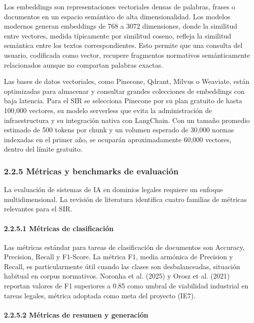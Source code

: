 \documentclass[12pt,a4paper,oneside]{report}
\begin{document}
Los embeddings son representaciones vectoriales densas de palabras,
frases o documentos en un espacio semántico de alta dimensionalidad. Los
modelos modernos generan embeddings de 768 a 3072 dimensiones, donde la
similitud entre vectores, medida típicamente por similitud coseno,
refleja la similitud semántica entre los textos correspondientes. Esto
permite que una consulta del usuario, codificada como vector, recupere
fragmentos normativos semánticamente relacionados aunque no compartan
palabras exactas.

Las bases de datos vectoriales, como Pinecone, Qdrant, Milvus o
Weaviate, están optimizadas para almacenar y consultar grandes
colecciones de embeddings con baja latencia. Para el SIR se selecciona
Pinecone por su plan gratuito de hasta 100,000 vectores, su modelo
serverless que evita la administración de infraestructura y su
integración nativa con LangChain. Con un tamaño promedio estimado de 500
tokens por chunk y un volumen esperado de 30,000 normas indexadas en el
primer año, se ocuparán aproximadamente 60,000 vectores, dentro del
límite gratuito.

\subsubsection{2.2.5 Métricas y benchmarks de
evaluación}\label{muxe9tricas-y-benchmarks-de-evaluaciuxf3n}

La evaluación de sistemas de IA en dominios legales requiere un enfoque
multidimensional. La revisión de literatura identifica cuatro familias
de métricas relevantes para el SIR.

\paragraph{2.2.5.1 Métricas de
clasificación}\label{muxe9tricas-de-clasificaciuxf3n}

Las métricas estándar para tareas de clasificación de documentos son
Accuracy, Precision, Recall y F1-Score. La métrica F1, media armónica de
Precision y Recall, es particularmente útil cuando las clases son
desbalanceadas, situación habitual en corpus normativos. Noronha et al.
(2025) y Orosz et al. (2021) reportan valores de F1 superiores a 0.85
como umbral de viabilidad industrial en tareas legales, métrica adoptada
como meta del proyecto (IE7).

\paragraph{2.2.5.2 Métricas de resumen y
generación}\label{muxe9tricas-de-resumen-y-generaciuxf3n}
\end{document}
